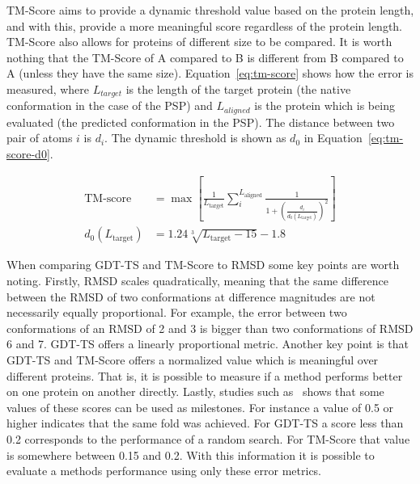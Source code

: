 \ac{TM-Score} aims to provide a dynamic threshold value based on the protein
length, and with this, provide a more meaningful score regardless of the
protein length. \ac{TM-Score} also allows for proteins of different size to be
compared. It is worth nothing that the \ac{TM-Score} of A compared to B is
different from B compared to A (unless they have the same size).
Equation~\eqref{eq:tm-score} shows how the error is measured, where
$L_{target}$ is the length of the target protein (the native conformation in
the case of the \ac{PSP}) and $L_{aligned}$ is the protein which is being
evaluated (the predicted conformation in the \ac{PSP}). The distance between
two pair of atoms $i$ is $d_i$. The dynamic threshold is shown as $d_0$ in
Equation~\eqref{eq:tm-score-d0}.


\begin{align}
    \text{TM-score}&=\max\left[ \frac{1}{L_\text{target}}\sum_i^{L_\text{aligned}}\frac{1}{1+\left(\frac{d_i}{d_0(L_\text{target})}\right)^2} \right] \label{eq:tm-score} \\
    d_0(L_\text{target})&=1.24\sqrt[3]{L_\text{target}-15}-1.8 \label{eq:tm-score-d0}
\end{align}

When comparing \ac{GDT-TS} and \ac{TM-Score} to \ac{RMSD} some key points are
worth noting. Firstly, \ac{RMSD} scales quadratically, meaning that the same
difference between the \ac{RMSD} of two conformations at difference magnitudes
are not necessarily equally proportional. For example, the error between two
conformations of an \ac{RMSD} of 2 and 3 is bigger than two conformations of
\ac{RMSD} 6 and 7. \ac{GDT-TS} offers a linearly proportional metric. Another
key point is that \ac{GDT-TS} and \ac{TM-Score} offers a normalized value which
is meaningful over different proteins. That is, it is possible to measure if a
method performs better on one protein on another directly. Lastly, studies such
as~\cite{xu2010significant} shows that some values of these scores can be used
as milestones. For instance a value of 0.5 or higher indicates that the same
fold was achieved. For \ac{GDT-TS} a score less than 0.2 corresponds to the
performance of a random search. For \ac{TM-Score} that value is somewhere
between 0.15 and 0.2. With this information it is possible to evaluate a
methods performance using only these error metrics.

